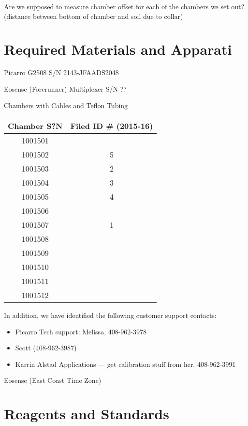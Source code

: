 \documentclass[12pt]{../SOP3}\usepackage[]{graphicx}\usepackage[]{color}
\begin{document}
\NP Are we supposed to measure chamber offset for each of the chambers we set out? (distance between bottom of chamber and soil due to collar)


\section{Required Materials and Apparati}

\NP Picarro G2508 S/N 2143-JFAADS2048

\NP Eosense (Forerunner) Multiplexer S/N ??

\NP Chambers with Cables and Teflon Tubing

\begin{table}
\begin{tabular}{cc} \hline
Chamber S?N   & Filed ID \# (2015-16)  \\ \hline\hline
1001501       &         \\
1001502       &  5       \\
1001503       &  2       \\
1001504       &   3      \\
1001505       &   4      \\
1001506       &         \\
1001507       &  1       \\
1001508       &         \\
1001509       &         \\
1001510       &         \\
1001511       &         \\
1001512       &         \\ \hline
\end{tabular}
\end{table}


\NP In addition, we have identified the following customer support contacts:

\begin{itemize}
  \item Picarro Tech support: Melissa, 408-962-3978
  \item Scott (408-962-3987)
  \item Karrin Alstad Applications --- get calibration stuff from her. 408-962-3991
\end{itemize}

\NP Eosense (East Coast Time Zone)


\section{Reagents and Standards}
\end{document}
